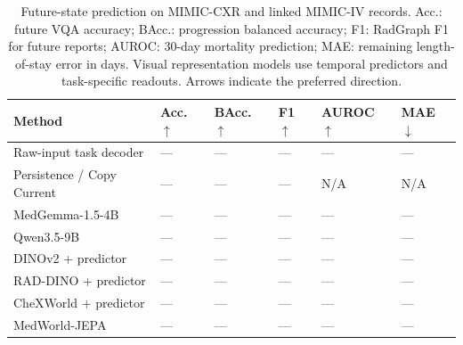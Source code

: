 \begin{table}[!t]
\centering
\caption{Future-state prediction on MIMIC-CXR and linked MIMIC-IV records. Acc.: future VQA accuracy; BAcc.: progression balanced accuracy; F1: RadGraph F1 for future reports; AUROC: 30-day mortality prediction; MAE: remaining length-of-stay error in days. Visual representation models use temporal predictors and task-specific readouts. Arrows indicate the preferred direction.}
\label{tab:future_prediction}
\begingroup
\small
\setlength{\tabcolsep}{3.5pt}
\renewcommand{\arraystretch}{1.12}
\begin{tabular}{L{\tabcolsep\relax}*{5}{C{\tabcolsep\relax}}}
\toprule
{}
\textbf{Method} & \textbf{Acc.} $\uparrow$ & \textbf{BAcc.} $\uparrow$ & \textbf{F1} $\uparrow$ & \textbf{AUROC} $\uparrow$ & \textbf{MAE} $\downarrow$ \\
\midrule
Raw-input task decoder & --- & --- & --- & --- & --- \\
Persistence / Copy Current & --- & --- & --- & N/A & N/A \\
\midrule
MedGemma-1.5-4B & --- & --- & --- & --- & --- \\
Qwen3.5-9B & --- & --- & --- & --- & --- \\
\midrule
DINOv2 + predictor & --- & --- & --- & --- & --- \\
RAD-DINO + predictor & --- & --- & --- & --- & --- \\
CheXWorld + predictor & --- & --- & --- & --- & --- \\
\midrule
{}
MedWorld-JEPA & --- & --- & --- & --- & --- \\
\bottomrule
\end{tabular}
\endgroup
\vspace{-2mm}
\end{table}
